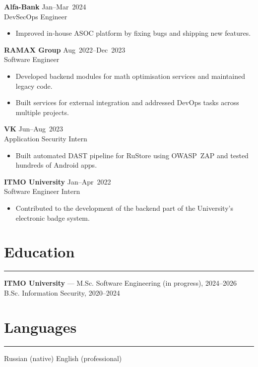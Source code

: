 \documentclass[10pt,a4paper]{article}
\newcommand{\sectionline}{\vspace{-4pt}\noindent\rule{\linewidth}{0.4pt}\vspace{4pt}}
\begin{document}
\textbf{Alfa-Bank} \hfill Jan--Mar~2024\\
DevSecOps Engineer
\begin{itemize}[leftmargin=*,noitemsep,topsep=2pt]
  \item Improved in‑house ASOC platform by fixing bugs and shipping new features.
\end{itemize}

\textbf{RAMAX Group} \hfill Aug~2022--Dec~2023\\
Software Engineer
\begin{itemize}[leftmargin=*,noitemsep,topsep=2pt]
  \item Developed backend modules for math optimisation services and maintained legacy code.
  \item Built services for external integration and addressed DevOps tasks across multiple projects.
\end{itemize}

\textbf{VK} \hfill Jun--Aug~2023\\
Application Security Intern
\begin{itemize}[leftmargin=*,noitemsep,topsep=2pt]
  \item Built automated DAST pipeline for RuStore using OWASP~ZAP and tested hundreds of Android apps.
\end{itemize}

\textbf{ITMO University} \hfill Jan--Apr~2022\\
Software Engineer Intern
\begin{itemize}[leftmargin=*,noitemsep,topsep=2pt]
  \item Contributed to the development of the backend part of the University's electronic badge system.
\end{itemize}

\section*{Education}
\sectionline

\textbf{ITMO University} --- M.Sc. Software Engineering (in progress), 2024--2026\\
B.Sc. Information Security, 2020--2024

\section*{Languages}
\sectionline

Russian (native) \textbullet{} English (professional)
\end{document}
